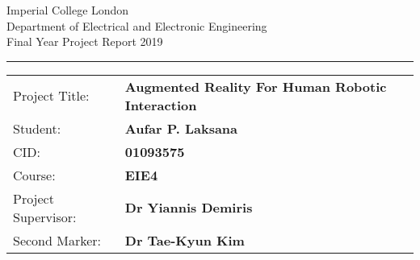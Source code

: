 \begin{titlepage}
	\setlength{\parindent}{0pt}
	\setlength{\parskip}{0pt}
	
	{
		\Large
		\raggedright
		Imperial College London\\[17pt]
		Department of Electrical and Electronic Engineering\\[17pt]
		Final Year Project Report 2019\\[17pt]
		
	}
	
	\rule{\columnwidth}{3pt}
	\vfill
	\centering
	\vfill
	\setlength{\tabcolsep}{0pt}
	
	\begin{tabular}{p{40mm}p{\dimexpr\columnwidth-40mm}}
		Project Title: & \textbf{Augmented Reality For Human Robotic Interaction} \\[12pt]
		Student: & \textbf{Aufar P. Laksana} \\[12pt]
		CID: & \textbf{01093575} \\[12pt]
		Course: & \textbf{EIE4} \\[12pt]
		Project Supervisor: & \textbf{Dr Yiannis Demiris} \\[12pt]
		Second Marker: & \textbf{Dr Tae-Kyun Kim} \\
	\end{tabular}
\end{titlepage}